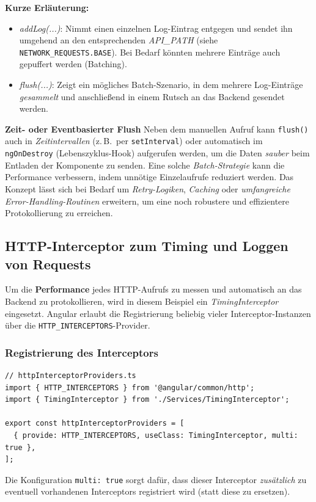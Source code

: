 \documentclass[12pt,oneside]{article}
\begin{document}
\noindent
\textbf{Kurze Erläuterung:}
\begin{itemize}
    \item \emph{addLog(...)}: Nimmt einen einzelnen Log-Eintrag entgegen und sendet ihn umgehend an den entsprechenden \emph{API\_PATH} (siehe \lstinline|NETWORK_REQUESTS.BASE|). Bei Bedarf könnten mehrere Einträge auch gepuffert werden (Batching).
    \item \emph{flush(...)}: Zeigt ein mögliches Batch-Szenario, in dem mehrere Log-Einträge \emph{gesammelt} und anschließend in einem Rutsch an das Backend gesendet werden. 

\end{itemize}

\noindent
\textbf{Zeit- oder Eventbasierter Flush}  
Neben dem manuellen Aufruf kann \lstinline|flush()| auch in \emph{Zeitintervallen} (z.\,B.\ per \lstinline|setInterval|) oder automatisch im \lstinline|ngOnDestroy| (Lebenszyklus-Hook) aufgerufen werden, um die Daten \emph{sauber} beim Entladen der Komponente zu senden. Eine solche \emph{Batch-Strategie} kann die Performance verbessern, indem unnötige Einzelaufrufe reduziert werden. Das Konzept lässt sich bei Bedarf um \emph{Retry-Logiken}, \emph{Caching} oder \emph{umfangreiche Error-Handling-Routinen} erweitern, um eine noch robustere und effizientere Protokollierung zu erreichen.

\subsection{HTTP-Interceptor zum Timing und Loggen von Requests}
\label{subsec:timing_interceptor}

Um die \textbf{Performance} jedes HTTP-Aufrufs zu messen und automatisch an das Backend zu protokollieren, wird in diesem Beispiel ein \emph{TimingInterceptor} eingesetzt. Angular erlaubt die Registrierung beliebig vieler Interceptor-Instanzen über die \lstinline|HTTP_INTERCEPTORS|-Provider.

\subsubsection{Registrierung des Interceptors}
\begin{lstlisting}
// httpInterceptorProviders.ts
import { HTTP_INTERCEPTORS } from '@angular/common/http';
import { TimingInterceptor } from './Services/TimingInterceptor';

export const httpInterceptorProviders = [
  { provide: HTTP_INTERCEPTORS, useClass: TimingInterceptor, multi: true },
];
\end{lstlisting}
\noindent
Die Konfiguration \lstinline|multi: true| sorgt dafür, dass dieser Interceptor \emph{zusätzlich} zu eventuell vorhandenen Interceptors registriert wird (statt diese zu ersetzen). 
\end{document}
